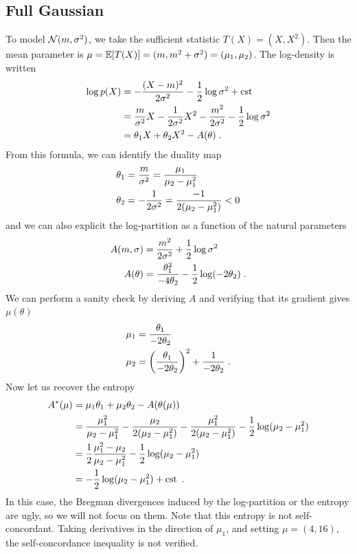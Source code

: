 \documentclass{article}
\newcommand{\logpart}{A}
\newcommand{\conj}{\logpart^*}
\newcommand{\nat}{\theta}
\begin{document}
\subsection{Full Gaussian}
To model ${\mathcal N}(m,\sigma^2)$, we take the sufficient statistic $T(X) = (X, X^2)$. Then the mean parameter is $\mu = \operatorname{\mathbb{E}}[T(X)] = ( m , m^2 + \sigma^2) = (\mu_1, \mu_2) $.
The log-density is written
\begin{align}
	\log p(X) 
	&= -\frac{(X-m)^2}{2 \sigma^2} - \half \log \sigma^2 + \cst \\
	&=  \frac{m}{\sigma^2} X -\inv{2 \sigma^2} X^2 - \frac{m^2}{2 \sigma^2} - \half \log \sigma^2 \\
	&=  \nat_1 X + \nat_2 X^2  - \logpart(\nat) \; .
\end{align}
From this formula, we can identify the duality map
\begin{align}
	\nat_1 &= \frac{m}{\sigma^2} = \frac{\mu_1}{\mu_2 - \mu_1^2} \\
	\nat_2 &= -\inv{2 \sigma^2} =  \frac{ - 1}{2(\mu_2 - \mu_1^2)}  < 0
\end{align}
and we can also explicit the log-partition as a function of the natural parameters
\begin{align}
	\logpart(m, \sigma) &= \frac{m^2}{2 \sigma^2} + \half \log \sigma^2 \\
	\logpart(\nat) &= \frac{\nat_1^2}{-4\nat_2} - \half \log(-2\nat_2) \; .
\end{align}
We can perform a sanity check by deriving $\logpart$ and verifying that its gradient gives $\mu(\nat)$
\begin{align}
	\mu_1 &= \frac{\nat_1}{-2\nat_2}  \\
	\mu_2 & = \left( \frac{\nat_1}{-2\nat_2} \right)^2 + \inv{-2 \nat_2} \; .
\end{align}
Now let us recover the entropy
\begin{align}
	\conj (\mu) &= \mu_1 \nat_1 + \mu_2 \nat_2  - \logpart(\nat(\mu)) \\
	& = \frac{\mu_1^2}{\mu_2 - \mu_1^2}  - \frac{\mu_2}{2(\mu_2 - \mu_1^2)} - \frac{\mu_1^2}{2(\mu_2 - \mu_1^2)}  - \half \log(\mu_2 - \mu_1^2) \\
	&= \half \frac{\mu_1^2 - \mu_2}{\mu_2 - \mu_1^2} - \half \log(\mu_2 - \mu_1^2) \\
	& = - \half \log (\mu_2 - \mu_1^2) + \cst \; .
\end{align}
In this case, the Bregman divergences induced by the log-partition or the entropy are ugly, so we will not focus on them.
Note that this entropy is not self-concordant. Taking derivatives in the direction of $\mu_1$, and setting $\mu = (4, 16)$,  the self-concordance inequality is not verified.
\end{document}
